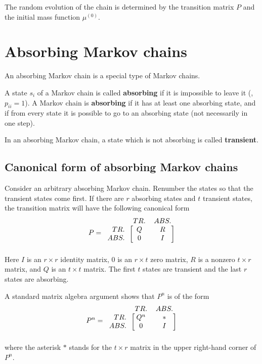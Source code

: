 The random evolution of the chain is determined by the transition matrix $P$ and the initial mass function $\mu^{(0)}$.


\section{Absorbing Markov chains}
An absorbing Markov chain is a special type of Markov chains.

\begin{definition}
A state $s_i$ of a Markov chain is called \textbf{absorbing} if it is impossible to leave it (\ie, $p_{ii} = 1$). A Markov chain is \textbf{absorbing} if it has at least one absorbing state, and if from every state it is possible to go to an absorbing state (not necessarily in one step).
\end{definition}

\begin{definition}
In an absorbing Markov chain, a state which is not absorbing is called \textbf{transient}.
\end{definition}

\subsection{Canonical form of absorbing Markov chains}
Consider an arbitrary absorbing Markov chain. Renumber the states so that the transient states come first. If there are $r$ absorbing states and $t$ transient states, the transition matrix will have the following canonical form
\begin{equation*}
    P = 
    \begin{blockarray}{rcc}
        & TR. & ABS. \\
    \begin{block}{r[cc]}
        TR. & Q &  R \\
        ABS. & 0 &  I \\
    \end{block}
    \end{blockarray}
\end{equation*}
Here $I$ is an $r\times r$ identity matrix, $0$ is an $r\times t$ zero matrix, $R$ is a nonzero $t\times r$ matrix, and $Q$ is an $t\times t$ matrix. The first $t$ states are transient and the last $r$ states are absorbing.

A standard matrix algebra argument shows that $P^n$ is of the form
\begin{equation*}
    P^n = 
    \begin{blockarray}{rcc}
        & TR. & ABS. \\
    \begin{block}{r[cc]}
        TR. & Q^n &  * \\
        ABS. & 0 &  I \\
    \end{block}
    \end{blockarray}
\end{equation*}
where the asterisk $*$ stands for the $t\times r$ matrix in the upper right-hand corner of $P^n$. 

